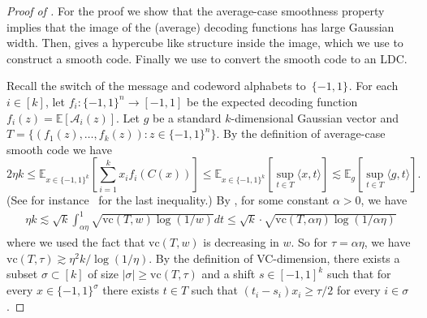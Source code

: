 \documentclass{toc}
\newcommand{\pmset}[1]{\{-1,1\}^{#1}} %
\newcommand{\sBC}{{\{-1,1\}}}
\newcommand{\E}{\mathbb{E}}
\newcommand{\cA}{{\mathcal A}}
\newcommand{\vc}{{\mathrm{vc}}}
\newcommand{\inpro}[2]{\langle #1,#2 \rangle}
\newcommand{\beqn}{\begin{equation*}}
\newcommand{\eeqn}{\end{equation*}}
\begin{document}
\begin{proof}[Proof of ]
For the proof we show that the average-case smoothness property implies that the image of the (average) decoding functions has large Gaussian width. 
Then,  gives a hypercube like structure inside the image, which we use to construct a smooth code. Finally we use  to convert the smooth code to an LDC.

Recall the switch of the message and codeword alphabets to~$\pmset{}$.
For each $i\in[k]$, let $f_i:\pmset{n}\to [-1,1]$ be the expected decoding function $f_i(z)=\E[\cA_i(z)]$.
Let $g$ be a standard $k$-dimensional Gaussian vector and 
$T=\{(f_1(z),\dots,f_k(z)):z\in \sBC^n\}$.
By the definition of average-case smooth code we have 
\beqn
2\eta k\le \E_{x\in \sBC^k}\left[\sum_{i=1}^k x_if_i(C(x))\right]\le \E_{x\in \sBC^k}\left[\sup_{t\in T} \inpro{x}{t} \right] \lesssim \E_{g}\left[\sup_{t\in T} \inpro{g}{t} \right].
\eeqn 
(See for instance~\cite[Lemma~3.2.10]{Talagrand:2014} for the last inequality.)
By , for some constant $\alpha>0$, we have 
\begin{align*}
\eta k \lesssim \sqrt{k} \int_{\alpha\eta}^1 \sqrt{\vc(T,w)\log(1/w)} dt \le \sqrt{k} \cdot \sqrt{\vc(T,\alpha\eta) \log(1/\alpha\eta)}
\end{align*} 
 where we used the fact that $\vc(T,w)$ is decreasing in $w$. So for $\tau=\alpha\eta$, we have $\vc(T,\tau)\gtrsim \eta^2 k/\log(1/\eta)$. By the definition of VC-dimension, there exists a subset $\sigma\subset [k]$ of size $|\sigma| \ge \vc(T,\tau)$ and a shift $s\in [-1,1]^k$ such that for every $x\in \sBC^\sigma$ there exists $t\in T$ such that $(t_i-s_i)x_i\ge \tau/2$ for every $i\in \sigma$.
 

\end{proof}
\end{document}

